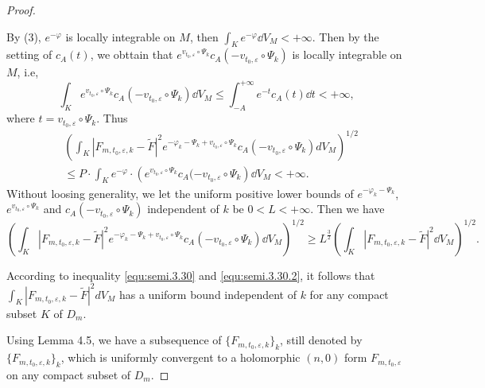 \begin{proof}
  \begin{tcolorbox}[title=\textbf{Analysis},colback=SeaGreen!10!CornflowerBlue!10,colframe=RoyalPurple!55!Aquamarine!100!,breakable]
    By (3), $e^{-\varphi}$ is locally integrable on $M$, then $\int_K e^{-\varphi}\dd V_M<+\infty$. Then by the setting of $c_A(t)$, we obttain that $e^{v_{t_0,\varepsilon}\circ\Psi_{k}}c_{A}(-v_{t_0,\varepsilon}\circ\Psi_{k})$ is locally integrable on $M$, i.e, 
    \begin{equation*}
      \int_K e^{v_{t_0,\varepsilon}\circ\Psi_{k}}c_{A}(-v_{t_0,\varepsilon}\circ\Psi_{k}) \dd V_M\leqslant \int_{-A}^{+\infty} e^{-t} c_A(t)\dd t<+\infty,
    \end{equation*}
      where $t=v_{t_0,\varepsilon}\circ \Psi_k$. Thus 
      \begin{align*}
                &\left(\int_{K}|F_{m,t_0,\varepsilon,k}-\widetilde{F}|^{2}
        e^{-\varphi_{k}-\Psi_{k}+v_{t_0,\varepsilon}\circ\Psi_{k}}c_{A}(-v_{t_0,\varepsilon}\circ\Psi_{k})dV_{M}\right)^{1/2}\\
        &\leqslant P\cdot \int_K  e^{-\varphi} \cdot \left(e^{v_{t_0,\varepsilon}\circ\Psi_{k}}c_{A}(-v_{t_0,\varepsilon}\circ\Psi_{k}\right)\dd V_M <+\infty.
      \end{align*}
\tcblower
Without loosing generality, we let the uniform positive
lower bounds of $e^{-\varphi_{k}-\Psi_{k}}$,
$e^{v_{t_{0},\varepsilon}\circ\Psi_{k}}$ and
$c_{A}(-v_{t_{0},\varepsilon}\circ\Psi_{k})$ independent of $k$ be $0<L<+\infty$. Then we have
\[
  \left(\int_{K}|F_{m,t_0,\varepsilon,k}-\widetilde{F}|^{2}
 e^{-\varphi_{k}-\Psi_{k}+v_{t_0,\varepsilon}\circ\Psi_{k}}c_{A}(-v_{t_0,\varepsilon}\circ\Psi_{k})\dd V_{M}\right)^{1/2}\geqslant L^{\frac 32}\left(\int_{K}|F_{m,t_0,\varepsilon,k}-\widetilde{F}|^{2} \dd V_{M}\right)^{1/2}.
\]
  \end{tcolorbox}


According to inequality \eqref{equ:semi.3.30} and \eqref{equ:semi.3.30.2}, it follows that
$\int_{K}|F_{m,t_0,\varepsilon,k}-\widetilde{F}|^{2}dV_{M}$ has a
uniform bound independent of $k$ for any compact subset $K$ of
$D_{m}$.

Using Lemma 4.5, we have a subsequence
of $\{F_{m,t_0,\varepsilon,k}\}_{k}$, still denoted by
$\{F_{m,t_0,\varepsilon,k}\}_{k}$, which is uniformly convergent to
a holomorphic $(n,0)$ form $F_{m,t_0,\varepsilon}$ on any compact
subset of $D_{m}$.


\end{proof}
